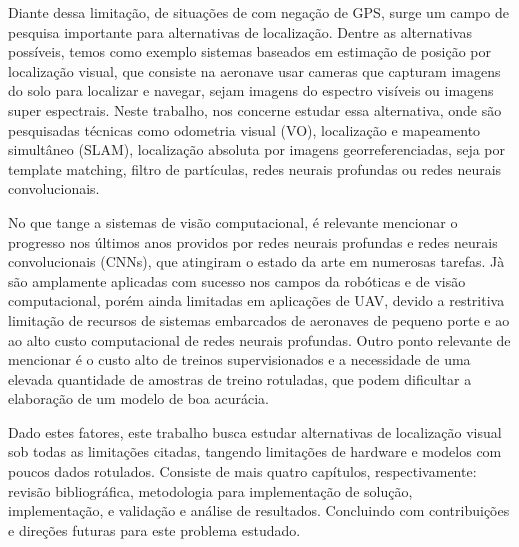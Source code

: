 Diante dessa limitação, de situações de com negação de GPS, surge um campo de pesquisa importante para alternativas de localização. Dentre as alternativas possíveis, temos como exemplo sistemas baseados em estimação de posição por localização visual, que consiste na aeronave usar cameras que capturam imagens do solo para localizar e navegar, sejam imagens do espectro visíveis ou imagens super espectrais. Neste trabalho, nos concerne estudar essa alternativa, onde são pesquisadas técnicas como odometria visual (VO), localização e mapeamento simultâneo (SLAM), localização absoluta por imagens georreferenciadas, seja por template matching, filtro de partículas, redes neurais profundas ou redes neurais convolucionais.

No que tange a sistemas de visão computacional, é relevante mencionar o progresso nos últimos anos providos por redes neurais profundas e redes neurais convolucionais (CNNs), que atingiram o estado da arte em numerosas tarefas. Jà são amplamente aplicadas com sucesso nos campos da robóticas e de visão computacional, porém ainda limitadas em aplicações de UAV, devido a restritiva limitação de recursos de sistemas embarcados de aeronaves de pequeno porte e ao ao alto custo computacional de redes neurais profundas. Outro ponto relevante de mencionar é o custo alto de treinos supervisionados e a necessidade de uma elevada quantidade de amostras de treino rotuladas, que podem dificultar a elaboração de um modelo de boa acurácia.

Dado estes fatores, este trabalho busca estudar alternativas de localização visual sob todas as limitações citadas, tangendo limitações de hardware e modelos com poucos dados rotulados. Consiste de mais quatro capítulos, respectivamente: revisão bibliográfica, metodologia para implementação de solução, implementação, e validação e análise de resultados. Concluindo com contribuições e direções futuras para este problema estudado.
